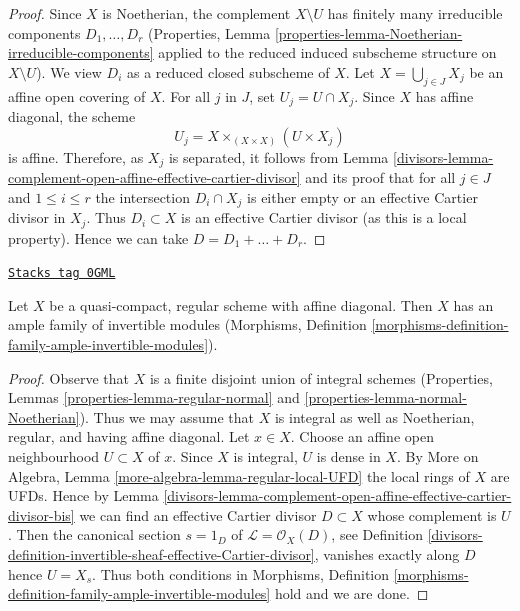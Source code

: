 \begin{proof}

Since $X$ is Noetherian, the complement $X \setminus U$ has finitely
many irreducible components $D_1, \ldots, D_r$
(Properties, Lemma \ref{properties-lemma-Noetherian-irreducible-components}
applied to the reduced induced subscheme structure on $X \setminus U$).
We view $D_i$ as a reduced closed subscheme of $X$.
Let $X = \bigcup_{j \in J} X_j$ be an affine open covering of $X$. For all
$j$ in $J$, set $U_j = U \cap X_j$. Since $X$ has affine diagonal,
the scheme
$$
U_j = X \times_{(X \times X)} (U \times X_j)
$$
is affine. Therefore, as $X_j$ is separated, it follows from
Lemma \ref{divisors-lemma-complement-open-affine-effective-cartier-divisor}
and its proof that for all $j \in J$ and $1 \leq i \leq r$ the
intersection $D_i \cap X_j$ is either empty or an
effective Cartier divisor in $X_j$.
Thus $D_i \subset X$ is an effective Cartier divisor (as this is
a local property). Hence we can take $D = D_1 + \ldots + D_r$.
\end{proof}

\begin{lemma}
\label{divisors-lemma-regular-ample-family}
\href{https://stacks.math.columbia.edu/tag/0GML}{\texttt{Stacks tag 0GML}}

Let $X$ be a quasi-compact, regular scheme with affine diagonal.
Then $X$ has an ample family of invertible modules
(Morphisms, Definition
\ref{morphisms-definition-family-ample-invertible-modules}).
\end{lemma}

\begin{proof}

Observe that $X$ is a finite disjoint union of integral schemes
(Properties, Lemmas
\ref{properties-lemma-regular-normal} and
\ref{properties-lemma-normal-Noetherian}).
Thus we may assume that $X$ is integral as well as Noetherian,
regular, and having affine diagonal. Let $x \in X$.
Choose an affine open neighbourhood $U \subset X$ of $x$.
Since $X$ is integral, $U$ is dense in $X$.
By More on Algebra, Lemma \ref{more-algebra-lemma-regular-local-UFD}
the local rings of $X$ are UFDs. Hence by Lemma
\ref{divisors-lemma-complement-open-affine-effective-cartier-divisor-bis}
we can find an effective Cartier divisor $D \subset X$
whose complement is $U$. Then the canonical section
$s = 1_D$ of $\mathcal{L} = \mathcal{O}_X(D)$,
see Definition \ref{divisors-definition-invertible-sheaf-effective-Cartier-divisor},
vanishes exactly along $D$ hence $U = X_s$.
Thus both conditions in Morphisms, Definition
\ref{morphisms-definition-family-ample-invertible-modules}
hold and we are done.
\end{proof}

